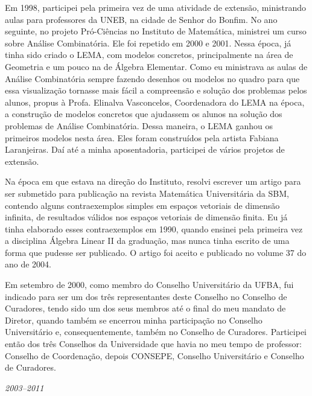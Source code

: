 \documentclass{hipatia}
\begin{document}
Em 1998, participei pela primeira vez de uma atividade de
extensão, ministrando aulas para professores da UNEB, na
cidade de Senhor do Bonfim. No ano seguinte, no projeto
Pró-Ciências no Instituto de Matemática, ministrei um curso
sobre Análise Combinatória. Ele foi repetido em 2000 e 2001.
Nessa época, já tinha sido criado o LEMA, com modelos
concretos, principalmente na área de Geometria e um pouco na
de Álgebra Elementar. Como eu ministrava as aulas de Análise
Combinatória sempre fazendo desenhos ou modelos no quadro
para que essa visualização tornasse mais fácil a compreensão
e solução dos problemas pelos alunos, propus à Profa.
Elinalva Vasconcelos, Coordenadora do LEMA
na época, %
a construção de
modelos concretos que ajudassem os alunos na solução dos
problemas de Análise Combinatória. Dessa maneira, o LEMA
ganhou os primeiros modelos nesta área. Eles foram
construídos pela artista Fabiana Laranjeiras. Daí até a
minha aposentadoria, participei de vários projetos de
extensão.

Na época em que estava na direção do Instituto, resolvi
escrever um artigo para ser submetido para publicação na
revista Matemática Universitária da SBM, contendo alguns
contraexemplos simples em espaços vetoriais de dimensão
infinita, de resultados válidos nos espaços vetoriais de
dimensão finita. Eu já tinha elaborado esses contraexemplos
em 1990, quando ensinei pela primeira vez a disciplina
Álgebra Linear II da graduação, mas nunca tinha escrito de
uma forma que pudesse ser publicado. O artigo foi aceito e
publicado no volume 37 do ano de 2004.

Em setembro de 2000, como membro do Conselho Universitário
da UFBA, fui indicado para ser um dos três representantes
deste Conselho no Conselho de Curadores, tendo sido um dos
seus membros até o final do meu mandato de Diretor, quando
também se encerrou minha participação no Conselho
Universitário e, consequentemente, também no Conselho de
Curadores. Participei então dos três Conselhos da
Universidade que havia no meu tempo de professor: Conselho
de Coordenação, depois CONSEPE, Conselho Universitário e
Conselho de Curadores.





\begin{center}\emph{2003--2011}\end{center}
\end{document}
